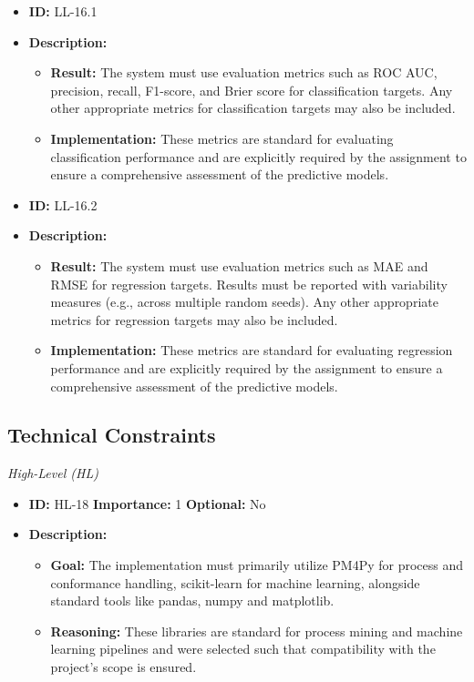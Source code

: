 \documentclass[12pt,a4paper]{article}
\begin{document}
\begin{itemize}
    \item \textbf{ID:} LL-16.1
    \item \textbf{Description:}
    \begin{itemize}
        \item \textbf{Result:} The system must use evaluation metrics such as ROC AUC, precision, recall, F1-score, and Brier score for classification targets. Any other appropriate metrics for classification targets may also be included.
        \item \textbf{Implementation:} These metrics are standard for evaluating classification performance and are explicitly required by the assignment to ensure a comprehensive assessment of the predictive models.
    \end{itemize}
\end{itemize}
\vspace{1.5em}

\begin{itemize}
    \item \textbf{ID:} LL-16.2
    \item \textbf{Description:}
    \begin{itemize}
        \item \textbf{Result:} The system must use evaluation metrics such as MAE and RMSE for regression targets. Results must be reported with variability measures (e.g., across multiple random seeds). Any other appropriate metrics for regression targets may also be included.
        \item \textbf{Implementation:} These metrics are standard for evaluating regression performance and are explicitly required by the assignment to ensure a comprehensive assessment of the predictive models.
    \end{itemize}
\end{itemize}
 \vspace{1.5em}

\subsection{Technical Constraints}

\noindent \textit{High-Level (HL)}

\begin{itemize}
    \item \textbf{ID:} HL-18
 \textbf{Importance:} 1
 \textbf{Optional:} No
    \item \textbf{Description:}
    \begin{itemize}
        \item \textbf{Goal:} The implementation must primarily utilize PM4Py for process and conformance handling, scikit-learn for machine learning, alongside standard tools like pandas, numpy and matplotlib.
        \item \textbf{Reasoning:} These libraries are standard for process mining and machine learning pipelines and were selected such that compatibility with the project's scope is ensured.
    \end{itemize}
\end{itemize}
\vspace{1.5em}
\end{document}
